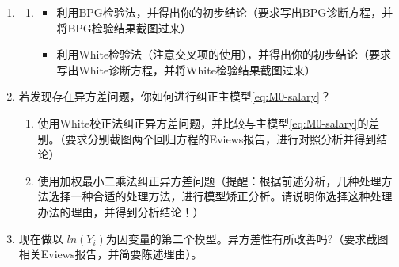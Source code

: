 \documentclass[12pt,(landscape,a4paper),(portrait,a4paper)]{article}
\providecommand{\tightlist}{%
  \setlength{\itemsep}{0pt}\setlength{\parskip}{0pt}}
\begin{document}
\begin{enumerate}
\def\labelenumi{\arabic{enumi}.}
\setcounter{enumi}{2}
\item
  \begin{enumerate}
  \def\labelenumii{\alph{enumii}.}
  \setcounter{enumii}{1}
  \item
    \begin{itemize}
    \tightlist
    \item
      利用BPG检验法，并得出你的初步结论（要求写出BPG诊断方程，并将BPG检验结果截图过来）\\
    \item
      利用White检验法（注意交叉项的使用），并得出你的初步结论（要求写出White诊断方程，并将White检验结果截图过来）\\
    \end{itemize}
  \end{enumerate}
\item
  若发现存在异方差问题，你如何进行纠正主模型\eqref{eq:M0-salary}？

  \begin{enumerate}
  \def\labelenumii{\alph{enumii}.}
  \tightlist
  \item
    使用White校正法纠正异方差问题，并比较与主模型\eqref{eq:M0-salary}的差别。（要求分别截图两个回归方程的Eviews报告，进行对照分析并得到结论）\\
  \item
    使用加权最小二乘法纠正异方差问题（提醒：根据前述分析，几种处理方法选择一种合适的处理方法，进行模型矫正分析。请说明你选择这种处理办法的理由，并得到分析结论！）\\
  \end{enumerate}
\item
  现在做以
  \(ln(Y_i)\)为因变量的第二个模型。异方差性有所改善吗?（要求截图相关Eviews报告，并简要陈述理由）。
\end{enumerate}
\end{document}

